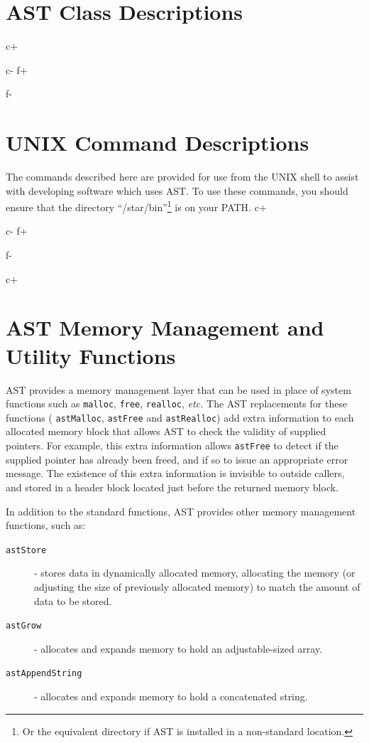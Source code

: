 \documentclass[twoside,11pt]{starlink}
\begin{document}
\cleardoublepage
\section{\label{ss:classdescriptions}AST Class Descriptions}
\small
c+

c-
f+

f-
\normalsize

\cleardoublepage
\section{\label{ss:commanddescriptions}UNIX Command Descriptions}
The commands described here are provided for use from the UNIX shell
to assist with developing software which uses AST. To use these
commands, you should ensure that the directory
``/star/bin''\footnote{Or the equivalent directory if AST is installed
in a non-standard location.} is on your PATH.
\small
c+

c-
f+

f-
\normalsize

c+
\cleardoublepage
\section{\label{ss:memoryfunctions}AST Memory Management and Utility Functions}
AST provides a memory management layer that can be used in place of
system functions such as \texttt{malloc}, \texttt{free}, \texttt{realloc},
\emph{etc.} The AST replacements for these functions ( \texttt{astMalloc},
\texttt{astFree} and \texttt{astRealloc}) add extra information to each
allocated memory block that allows AST to check the validity of supplied
pointers. For example, this extra information allows \texttt{astFree} to
detect if the supplied pointer has already been freed, and if so to issue
an appropriate error message. The existence of this extra information is
invisible to outside callers, and stored in a header block located just
before the returned memory block.

In addition to the standard functions, AST provides other memory management
functions, such as:

\begin{description}
\item [\texttt{astStore}] - stores data in dynamically allocated memory, allocating
the memory (or adjusting the size of previously allocated memory) to match
the amount of data to be stored.
\item [\texttt{astGrow}] - allocates and expands memory to hold an adjustable-sized array.
\item [\texttt{astAppendString}] - allocates and expands memory to hold a
concatenated string.
\end{description}
\end{document}
